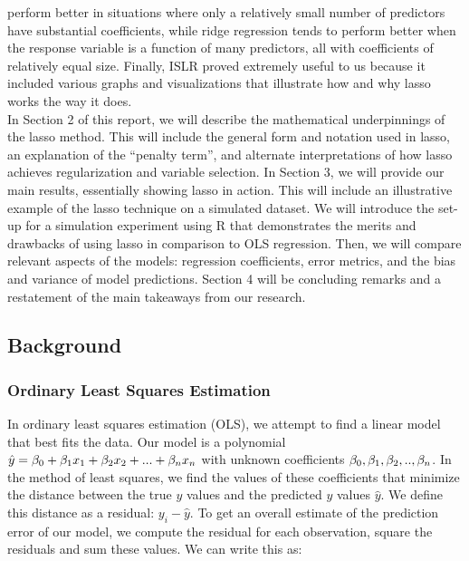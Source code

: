 \documentclass[
]{article}
\begin{document}
perform better in situations where only a relatively small number of
predictors have substantial coefficients, while ridge regression tends
to perform better when the response variable is a function of many
predictors, all with coefficients of relatively equal size. Finally,
ISLR proved extremely useful to us because it included various graphs
and visualizations that illustrate how and why lasso works the way it
does.\\
\hspace*{0.333em}\hspace*{0.333em}\hspace*{0.333em}\hspace*{0.333em}In
Section 2 of this report, we will describe the mathematical
underpinnings of the lasso method. This will include the general form
and notation used in lasso, an explanation of the ``penalty term'', and
alternate interpretations of how lasso achieves regularization and
variable selection. In Section 3, we will provide our main results,
essentially showing lasso in action. This will include an illustrative
example of the lasso technique on a simulated dataset. We will introduce
the set-up for a simulation experiment using R that demonstrates the
merits and drawbacks of using lasso in comparison to OLS regression.
Then, we will compare relevant aspects of the models: regression
coefficients, error metrics, and the bias and variance of model
predictions. Section 4 will be concluding remarks and a restatement of
the main takeaways from our research.

\hypertarget{background}{%
\subsection{Background}\label{background}}

\hypertarget{ordinary-least-squares-estimation}{%
\subsubsection{Ordinary Least Squares
Estimation}\label{ordinary-least-squares-estimation}}

In ordinary least squares estimation (OLS), we attempt to find a linear
model that best fits the data. Our model is a polynomial
\(\hat{y} = \beta_0 +\beta_1x_1 + \beta_2x_2 + \space ... \space + \beta_nx_n\)
with unknown coefficients
\(\beta_0, \space \beta_1, \space \beta_2, \space .., \space \beta_n\).
In the method of least squares, we find the values of these coefficients
that minimize the distance between the true \(y\) values and the
predicted \(y\) values \(\hat{y}\). We define this distance as a
residual: \(y_i- \hat{y}\). To get an overall estimate of the prediction
error of our model, we compute the residual for each observation, square
the residuals and sum these values. We can write this as:
\end{document}
